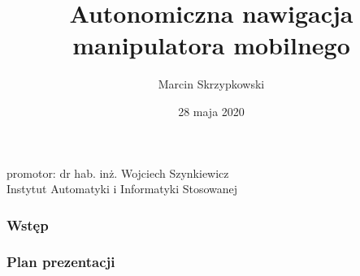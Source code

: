 \documentclass[aspectratio=169,11pt]{beamer}
\date{28 maja 2020}
\author{Marcin Skrzypkowski}
\title{Autonomiczna nawigacja manipulatora mobilnego}
\begin{document}
{
\begin{frame}
\titlepage
	\begin{center}
		promotor: dr hab. inż. Wojciech Szynkiewicz \\
		\small{Instytut Automatyki i Informatyki Stosowanej}
	\end{center}
\end{frame}
}

{
\begin{frame}
\frametitle{Wstęp}
	\begin{figure}[!tbp]
		\centering
  	\hfill
	\end{figure}
\end{frame}
}

{
\begin{frame}
\frametitle{Plan prezentacji}
	\begin{multicols}{2}
		\tableofcontents
	\end{multicols}
\end{frame}
}
\end{document}
